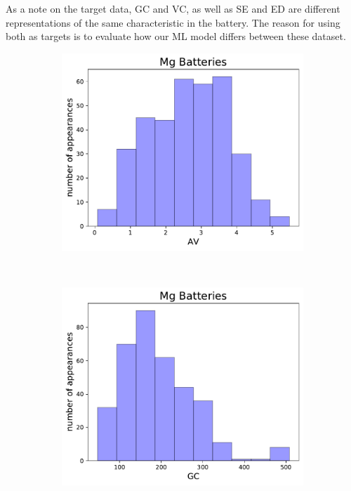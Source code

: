 As a note on the target data, GC and VC, as well as SE and ED are different representations of the same characteristic in the battery. The reason for using both as targets is to evaluate how our ML model differs between these dataset.
 \begin{figure}[h]
     \centering
     \begin{subfigure}{0.3\textwidth}
         \centering
         \includegraphics[width=\linewidth]{result/figures/columnsplotMg_AV.pdf}
         \caption{}
     \end{subfigure}
     ~ 
     \begin{subfigure}{0.3\textwidth}
         \centering
         \includegraphics[width=\linewidth]{result/figures/columnsplotMg_GC.pdf}

\end{subfigure}
\end{figure}
